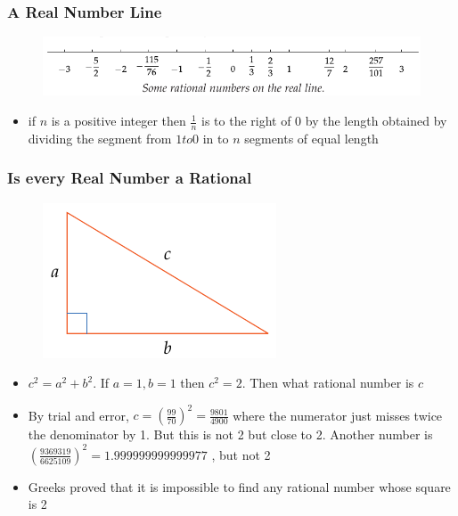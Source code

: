 \documentclass{beamer}
\begin{document}
\begin{frame}
    \frametitle{A Real Number Line}
    \begin{figure}[h]    
        \begin{minipage}[b]{0.8\textwidth}
        \centering
        \includegraphics[scale=0.35]{real-line.png}
    \end{minipage}
\end{figure}
\begin{itemize}
    \item if \( n\) is a positive integer then \( \frac{1}{n}\) is to the right of 0 by the length obtained by dividing the segment from \( 1 to 0\) in to \( n \) segments of equal length
\end{itemize}
\end{frame}

\begin{frame}
    \frametitle{Is every Real Number a Rational}
    \begin{figure}[h]    
        \begin{minipage}[b]{0.8\textwidth}
        \centering
        \includegraphics[scale=0.35]{irrational-geometry.png}
        \end{minipage}
    \end{figure}
    \begin{itemize}
        \item \( c^{2} = a^{2} + b^{2} \). If \( a = 1, b = 1\) then \(c^{2} = 2 \). Then what rational number is \( c \)
        \item By trial and error, \( c = \left( \frac{99}{70} \right)^{2}  = \frac{9801}{4900}\) where the numerator just misses twice the denominator by 1. But this is not 2 but close to 2. Another number is \( \left( \frac{9369319}{6625109} \right)^{2} = 1.999999999999977\) , but not 2
        \item Greeks proved that it is impossible to find any rational number whose square is 2
    \end{itemize} 
\end{frame}
\end{document}

